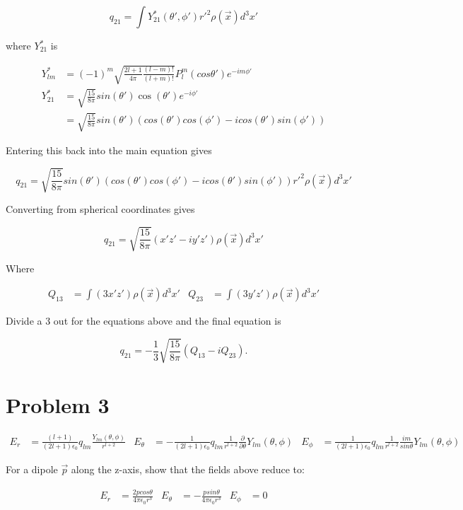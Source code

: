 \documentclass[11pt]{article}
\begin{document}
$$
q_{21} = \int Y^{*}_{21}(\theta', \phi') r'^{2} \rho(\vec{x}) d^{3}x'
$$

where $Y^{*}_{21}$ is 

\begin{align*}
Y^{*}_{lm} &= (-1)^{m} \sqrt{\frac{2l+1}{4\pi}\frac{(l-m)!}{(l+m)!}} P_{l}^{m}(cos\theta')e^{-im\phi'} \\Y^{*}_{21} &= \sqrt{\frac{15}{8\pi}}sin(\theta')\cos(\theta')e^{-i\phi'}\\ 
&= \sqrt{\frac{15}{8\pi}}sin(\theta')(cos(\theta')cos(\phi') - icos(\theta')sin(\phi'))
\end{align*}

Entering this back into the main equation gives

$$
q_{21} = \sqrt{\frac{15}{8\pi}}sin(\theta')(cos(\theta')cos(\phi') - icos(\theta')sin(\phi'))r'^{2} \rho(\vec{x}) d^{3}x'
$$

Converting from spherical coordinates gives 

$$
q_{21} = \sqrt{\frac{15}{8\pi}} (x'z' - iy'z') \rho(\vec{x}) d^{3}x'
$$

Where

\begin{align*}
Q_{13} &= \int (3x'z') \rho(\vec{x}) d^{3}x' & Q_{23} &= \int (3y'z') \rho(\vec{x}) d^{3}x'
\end{align*}

Divide a 3 out for the equations above and the final equation is

$$
q_{21} = -\frac{1}{3}\sqrt{\frac{15}{8\pi}}(Q_{13}-iQ_{23}).
$$

\clearpage

\section*{Problem 3}

\begin{align*}
    E_{r} &= \frac{(l+1)}{(2l+1)\epsilon_{0}}q_{lm} \frac{Y_{lm}(\theta, \phi)}{r^{l+2}} &
    E_{\theta} &= -\frac{1}{(2l+1)\epsilon_{0}} q_{lm} \frac{1}{r^{l+2}}\frac{\partial}{\partial \theta} Y_{lm}(\theta, \phi) &
    E_{\phi} &= \frac{1}{(2l+1)\epsilon_{0}}q_{lm} \frac{1}{r^{l+2}} \frac{im}{sin\theta}Y_{lm}(\theta, \phi)
\end{align*}

For a dipole $\vec{p}$ along the z-axis, show that the fields above reduce to:

\begin{align*}
    E_{r} &= \frac{2pcos\theta}{4\pi\epsilon_{0}r^{3}} &
    E_{\theta} &= -\frac{psin\theta}{4\pi\epsilon_{0}r^{3}}&
    E_{\phi} &= 0
\end{align*}
\end{document}
